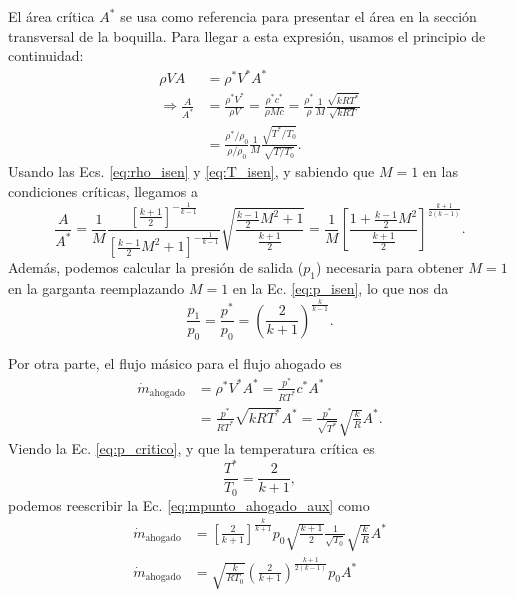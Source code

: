 El área crítica $A^*$ se usa como referencia para presentar el área en la sección transversal de la boquilla.
Para llegar a esta expresión, usamos el principio de continuidad:
%
\begin{align}
\rho VA &= \rho^* V^* A^*\nonumber\\
\Rightarrow \frac{A}{A^*} &= \frac{\rho^* V^*}{\rho V} = \frac{\rho^* c^*}{\rho Mc} = \frac{\rho^*}{\rho} \frac{1}{M}\frac{\sqrt{kRT^*}}{\sqrt{kRT}}\nonumber\\
&=\frac{\rho^*/\rho_0}{\rho/\rho_0} \frac{1}{M}\frac{\sqrt{T^*/T_0}}{\sqrt{T/T_0}}.
\end{align}
%
Usando las Ecs. \eqref{eq:rho_isen} y \eqref{eq:T_isen}, y sabiendo que $M=1$ en las condiciones críticas, llegamos a
%
\begin{equation}
\frac{A}{A^*} = \frac{1}{M} \frac{\left[\frac{k+1}{2}\right]^{-\frac{1}{k-1}}}{\left[\frac{k-1}{2}M^2+1\right]^{-\frac{1}{k-1}}} \sqrt{\frac{\frac{k-1}{2}M^2+1}{\frac{k+1}{2}}} = \frac{1}{M} \left[\frac{1+\frac{k-1}{2}M^2}{\frac{k+1}{2}}\right]^{\frac{k+1}{2(k-1)}}.
\end{equation}
%
Además, podemos calcular la presión de salida ($p_1$) necesaria para obtener $M=1$ en la garganta reemplazando $M=1$ en la Ec. \eqref{eq:p_isen}, lo que nos da
%
\begin{equation}\label{eq:p_critico}
\frac{p_1}{p_0} = \frac{p^*}{p_0} = \left(\frac{2}{k+1}\right)^{\frac{k}{k-1}}.
\end{equation}

Por otra parte, el flujo másico para el flujo ahogado es
%
\begin{align}\label{eq:mpunto_ahogado_aux}
\dot{m}_\text{ahogado} &= \rho^* V^*A^* = \frac{p^*}{RT^*}c^*A^*\nonumber\\
&= \frac{p^*}{RT^*}\sqrt{kRT^*}A^* = \frac{p^*}{\sqrt{T^*}}\sqrt{\frac{k}{R}}A^*.
\end{align}
%
Viendo la Ec. \eqref{eq:p_critico}, y que la temperatura crítica es
%
\begin{equation}
\frac{T^*}{T_0} = \frac{2}{k+1},
\end{equation}
%
podemos reescribir la Ec. \eqref{eq:mpunto_ahogado_aux} como
%
\begin{align}\label{eq:mpunto_ahogado}
\dot{m}_\text{ahogado} &= \left[\frac{2}{k+1}\right]^{\frac{k}{k+1}}p_0\sqrt{\frac{k+1}{2}}\frac{1}{\sqrt{T_0}}\sqrt{\frac{k}{R}}A^*\nonumber\\
\dot{m}_\text{ahogado} &= \sqrt{\frac{k}{RT_0}}\left(\frac{2}{k+1}\right)^{\frac{k+1}{2(k-1)}}p_0A^*
\end{align}

